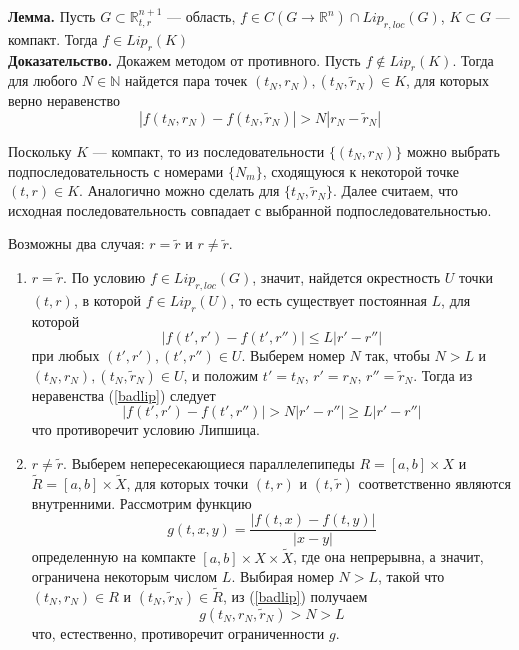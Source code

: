 \textbf{Лемма.} Пусть $G \subset \mathbb{R}_{t,r}^{n+1}$ --- область, $f \in C(G \to \mathbb{R}^n)\cap Lip_{r,loc}(G)$, $K \subset G$ --- компакт. Тогда $f \in Lip_r(K)$\\
\noindent \textbf{Доказательство.} Докажем методом от противного. Пусть $f \notin Lip_r(K)$. Тогда для любого $N \in \mathbb{N}$ найдется пара точек $(t_N,r_N), (t_N, \widetilde{r}_N) \in K$, для которых верно неравенство
\begin{equation}
    |f(t_N, r_N) - f(t_N, \widetilde{r}_N)| > N|r_N - \widetilde{r}_N| \label{badlip}
\end{equation}

Поскольку $K$ --- компакт, то из последовательности $\{(t_N, r_N)\}$ можно выбрать подпоследовательность с номерами $\{N_m\}$, сходящуюся к некоторой точке $(t,r) \in K$. Аналогично можно сделать для $\{t_N, \widetilde{r}_N\}$. Далее считаем, что исходная последовательность совпадает с выбранной подпоследовательностью.

Возможны два случая: $r = \widetilde{r}$ и $r \neq \widetilde{r}$.
\begin{enumerate}
    \item $r = \widetilde{r}$. По условию $f \in Lip_{r,loc}(G)$, значит, найдется окрестность $U$ точки $(t,r)$, в которой $f \in Lip_r(U)$, то есть существует постоянная $L$, для которой
    \begin{equation*}
        |f(t', r') - f(t', r'')| \le L|r' - r''|
    \end{equation*}
    при любых $(t',r'), (t',r'') \in U$. Выберем номер $N$ так, чтобы $N > L$ и $(t_N, r_N), (t_N, \widetilde{r}_N) \in U$, и положим $t' = t_N$, $r' = r_N$, $r'' = \widetilde{r}_N$. Тогда из неравенства (\ref{badlip}) следует
    \begin{equation*}
        |f(t',r') - f(t',r'')| > N|r' - r''| \ge L|r' - r''|
    \end{equation*}
    что противоречит условию Липшица.
    \item $r \neq \widetilde{r}$. Выберем непересекающиеся параллелепипеды $R = [a,b] \times X$ и $\widetilde{R} = [a,b] \times \widetilde{X}$, для которых точки $(t,r)$ и $(t,\widetilde{r})$ соответственно являются внутренними. Рассмотрим функцию
    \begin{equation*}
        g(t,x,y) = \frac{|f(t,x) - f(t,y)|}{|x - y|}
    \end{equation*}
    определенную на компакте $[a,b] \times X \times \widetilde{X}$, где она непрерывна, а значит, ограничена некоторым числом $L$. Выбирая номер $N > L$, такой что $(t_N, r_N) \in R$ и $(t_N, \widetilde{r}_N) \in \widetilde{R}$, из (\ref{badlip}) получаем
    \begin{equation*}
        g(t_N, r_N, \widetilde{r}_N) > N > L
    \end{equation*}
    что, естественно, противоречит ограниченности $g$.
\end{enumerate}
